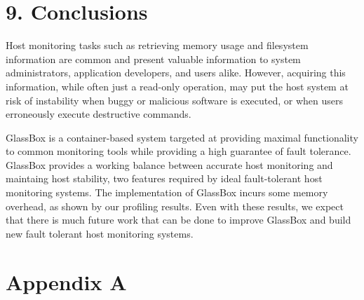 \documentclass{proc}
\begin{document}
\section*{9. Conclusions}

Host monitoring tasks such as retrieving memory usage and filesystem information are common and present valuable information to system administrators, application developers, and users alike. However, acquiring this information, while often just a read-only operation, may put the host system at risk of instability when buggy or malicious software is executed, or when users erroneously execute destructive commands.

GlassBox is a container-based system targeted at providing maximal functionality to common monitoring tools while providing a high guarantee of fault tolerance. GlassBox provides a working balance between accurate host monitoring and maintaing host stability, two features required by ideal fault-tolerant host monitoring systems. The implementation of GlassBox incurs some memory overhead, as shown by our profiling results. Even with these results, we expect that there is much future work that can be done to improve GlassBox and build new fault tolerant host monitoring systems.




\clearpage

\section*{Appendix A}

\clearpage
\end{document}
